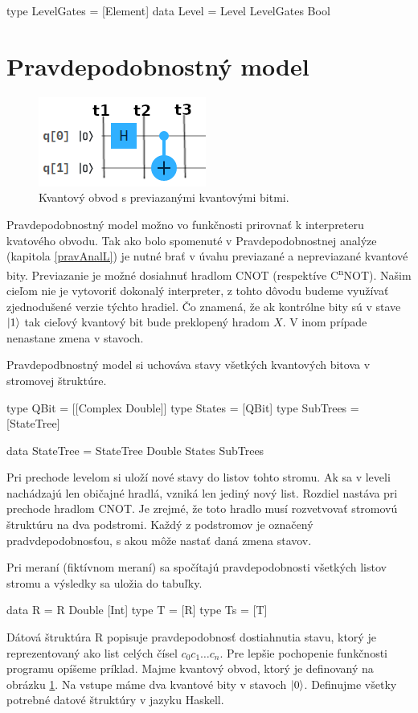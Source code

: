 \begin{code}
type LevelGates = [Element]
data Level = Level LevelGates Bool
\end{code}

\section{Pravdepodobnostný model}

\begin{figure}
	\centering 
	\includegraphics[width=.4\textwidth]{figures/circuit3.png} 
	\caption{Kvantový obvod s previazanými kvantovými bitmi.}
    \label{obvod}
\end{figure}

Pravdepodobnostný model možno vo funkčnosti prirovnať k interpreteru
kvatového obvodu. Tak ako bolo spomenuté v Pravdepodobnostnej analýze 
(kapitola \ref{pravAnalL}) je nutné brať v úvahu previazané a nepreviazané
kvantové bity. Previazanie je možné dosiahnuť hradlom CNOT (respektíve
C\textsuperscript{n}NOT). Našim cieľom nie je vytovoriť dokonalý interpreter,
z tohto dôvodu budeme využívať zjednodušené verzie týchto hradiel. Čo znamená,
že ak kontrólne bity sú v stave \(\ket{1}\) tak cieľový kvantový bit bude 
preklopený hradom \(X\). V inom prípade nenastane zmena v stavoch.


Pravdepodbnostný model si uchováva stavy všetkých kvantových bitova 
v stromovej štruktúre. 
\begin{code}
type QBit = [[Complex Double]]
type States = [QBit]
type SubTrees = [StateTree]

data StateTree = StateTree Double States SubTrees
\end{code}

Pri prechode levelom si uloží nové stavy do listov
tohto stromu. Ak sa v leveli nachádzajú len običajné hradlá, vzniká len
jediný nový list. Rozdiel nastáva pri prechode hradlom CNOT. Je zrejmé, že 
toto hradlo musí rozvetvovať stromovú štruktúru na dva podstromi. Každý z 
podstromov je označený pradvdepodobnosťou, s akou môže nastať daná zmena 
stavov. 

Pri meraní (fiktívnom meraní) sa spočítajú pravdepodobnosti všetkých listov
stromu a výsledky sa uložia do tabuľky. 
\begin{code}
data R = R Double [Int]
type T = [R]
type Ts = [T]
\end{code}
Dátová štruktúra R popisuje pravdepodobnosť dostiahnutia stavu, ktorý je 
reprezentovaný ako list celých čísel \(c_0c_1 \dots c_n\).
Pre lepšie pochopenie funkčnosti 
programu opíšeme príklad. Majme kvantový obvod, ktorý je definovaný na 
obrázku \ref{obvod}. Na vstupe máme dva kvantové bity v stavoch \(\ket{0}\).
Definujme všetky potrebné datové štruktúry v jazyku Haskell. 


